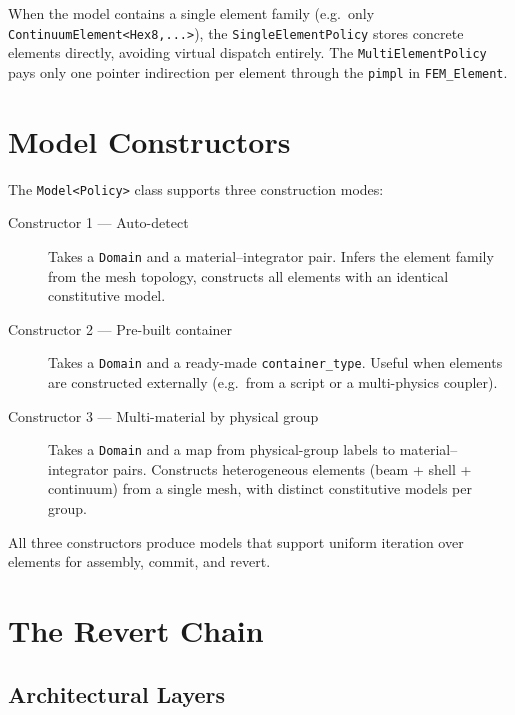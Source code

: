 \begin{remark}
When the model contains a single element family (e.g.\ only
\texttt{ContinuumElement<Hex8,...>}), the \texttt{SingleElementPolicy}
stores concrete elements directly, avoiding virtual dispatch entirely.
The \texttt{MultiElementPolicy} pays only one pointer indirection per
element through the \texttt{pimpl} in \texttt{FEM\_Element}.
\end{remark}

\section{Model Constructors}
\label{sec:model-constructors}

The \texttt{Model<Policy>} class supports three construction modes:

\begin{description}
  \item[Constructor 1 --- Auto-detect]
  Takes a \texttt{Domain} and a material--integrator pair.  Infers
  the element family from the mesh topology, constructs all elements
  with an identical constitutive model.

  \item[Constructor 2 --- Pre-built container]
  Takes a \texttt{Domain} and a ready-made \texttt{container\_type}.
  Useful when elements are constructed externally (e.g.\ from a script
  or a multi-physics coupler).

  \item[Constructor 3 --- Multi-material by physical group]
  Takes a \texttt{Domain} and a map from physical-group labels to
  material--integrator pairs.  Constructs heterogeneous elements
  (beam + shell + continuum) from a single mesh, with distinct
  constitutive models per group.
\end{description}

All three constructors produce models that support uniform iteration
over elements for assembly, commit, and revert.

\section{The Revert Chain}
\label{sec:revert-chain}

\subsection{Architectural Layers}
\label{sec:revert-layers}

